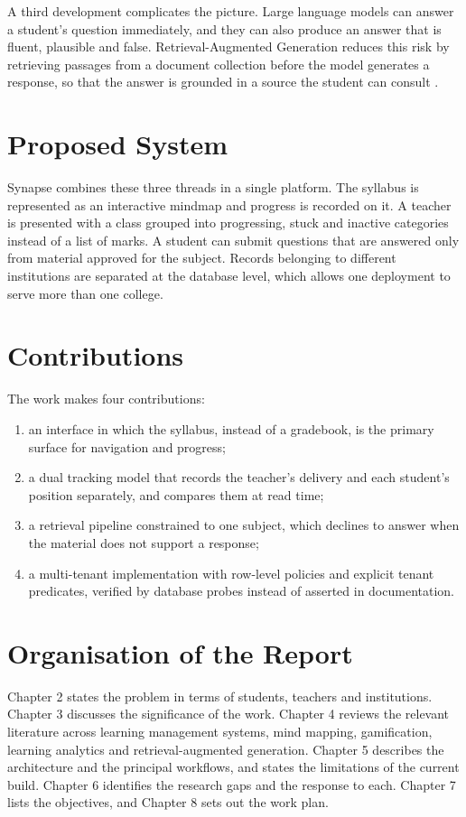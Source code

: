 A third development complicates the picture. Large language models can answer a student's question immediately, and they can also produce an answer that is fluent, plausible and false. Retrieval-Augmented Generation reduces this risk by retrieving passages from a document collection before the model generates a response, so that the answer is grounded in a source the student can consult \cite{lewis2020retrieval}.

\section{Proposed System}

Synapse combines these three threads in a single platform. The syllabus is represented as an interactive mindmap and progress is recorded on it. A teacher is presented with a class grouped into progressing, stuck and inactive categories instead of a list of marks. A student can submit questions that are answered only from material approved for the subject. Records belonging to different institutions are separated at the database level, which allows one deployment to serve more than one college.

\section{Contributions}

The work makes four contributions:
\begin{enumerate}
    \item an interface in which the syllabus, instead of a gradebook, is the primary surface for navigation and progress;
    \item a dual tracking model that records the teacher's delivery and each student's position separately, and compares them at read time;
    \item a retrieval pipeline constrained to one subject, which declines to answer when the material does not support a response;
    \item a multi-tenant implementation with row-level policies and explicit tenant predicates, verified by database probes instead of asserted in documentation.
\end{enumerate}

\section{Organisation of the Report}

Chapter 2 states the problem in terms of students, teachers and institutions. Chapter 3 discusses the significance of the work. Chapter 4 reviews the relevant literature across learning management systems, mind mapping, gamification, learning analytics and retrieval-augmented generation. Chapter 5 describes the architecture and the principal workflows, and states the limitations of the current build. Chapter 6 identifies the research gaps and the response to each. Chapter 7 lists the objectives, and Chapter 8 sets out the work plan.
